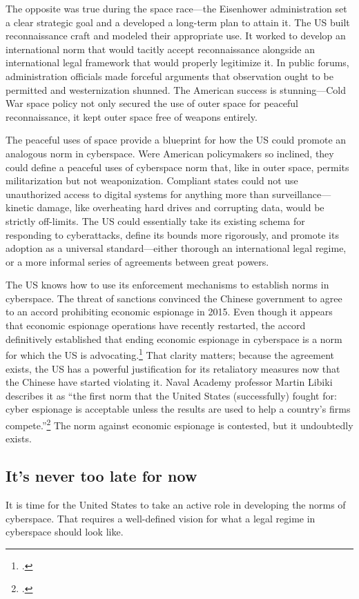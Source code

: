\documentclass[11pt]{memoir}
\begin{document}
The opposite was true during the space race---the Eisenhower administration set a clear strategic goal and a developed a long-term plan to attain it. The US built reconnaissance craft and modeled their appropriate use. It worked to develop an international norm that would tacitly accept reconnaissance alongside an international legal framework that would properly legitimize it. In public forums, administration officials made forceful arguments that observation ought to be permitted and westernization shunned. The American success is stunning---Cold War space policy not only secured the use of outer space for peaceful reconnaissance, it kept outer space free of weapons entirely.

The peaceful uses of space provide a blueprint for how the US could promote an analogous norm in cyberspace. Were American policymakers so inclined, they could define a peaceful uses of cyberspace norm that, like in outer space, permits militarization but not weaponization. Compliant states could not use unauthorized access to digital systems for anything more than surveillance---kinetic damage, like overheating hard drives and corrupting data, would be strictly off-limits. The US could essentially take its existing schema for responding to cyberattacks, define its bounds more rigorously, and promote its adoption as a universal standard---either thorough an international legal regime, or a more informal series of agreements between great powers.

The US knows how to use its enforcement mechanisms to establish norms in cyberspace. The threat of sanctions convinced the Chinese government to agree to an accord prohibiting economic espionage in 2015. Even though it appears that economic espionage operations have recently restarted, the accord definitively established that ending economic espionage in cyberspace is a norm for which the US is advocating.\footcite{bartz_u.s._2018} That clarity matters; because the agreement exists, the US has a powerful justification for its retaliatory measures now that the Chinese have started violating it. Naval Academy professor Martin Libiki describes it as ``the first norm that the United States (successfully) fought for: cyber espionage is acceptable unless the results are used to help a country’s firms compete.''\footcite{libicki_coming_2017} The norm against economic espionage is contested, but it undoubtedly exists.

\subsection{It's never too late for now}
It is time for the United States to take an active role in developing the norms of cyberspace. That requires a well-defined vision for what a legal regime in cyberspace should look like.
\end{document}
